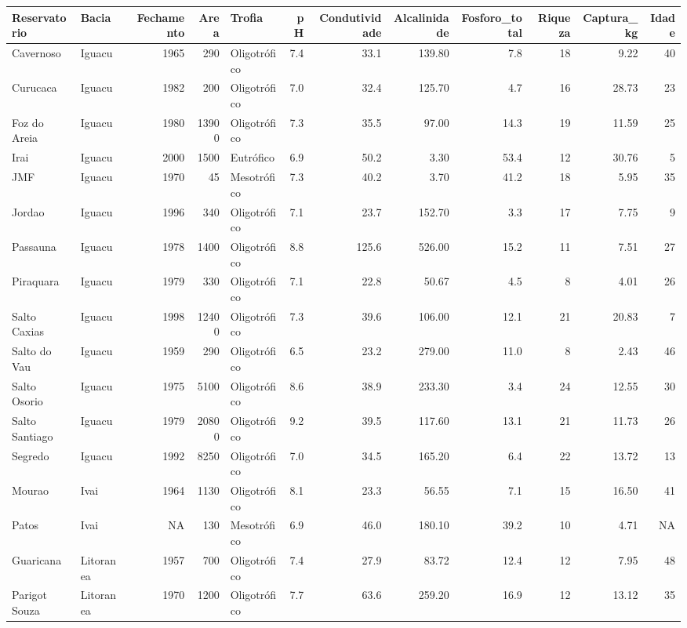 \documentclass[
]{book}
\begin{document}
\begin{table}
\centering\begingroup\fontsize{8}{10}\selectfont

\begin{tabular}{llrrlrrrrrrr}
\toprule
Reservatorio & Bacia & Fechamento & Area & Trofia & pH & Condutividade & Alcalinidade & Fosforo\_total & Riqueza & Captura\_kg & Idade\\
\midrule
Cavernoso & Iguacu & 1965 & 290 & Oligotrófico & 7.4 & 33.1 & 139.80 & 7.8 & 18 & 9.22 & 40\\
Curucaca & Iguacu & 1982 & 200 & Oligotrófico & 7.0 & 32.4 & 125.70 & 4.7 & 16 & 28.73 & 23\\
Foz do Areia & Iguacu & 1980 & 13900 & Oligotrófico & 7.3 & 35.5 & 97.00 & 14.3 & 19 & 11.59 & 25\\
Irai & Iguacu & 2000 & 1500 & Eutrófico & 6.9 & 50.2 & 3.30 & 53.4 & 12 & 30.76 & 5\\
JMF & Iguacu & 1970 & 45 & Mesotrófico & 7.3 & 40.2 & 3.70 & 41.2 & 18 & 5.95 & 35\\
\addlinespace
Jordao & Iguacu & 1996 & 340 & Oligotrófico & 7.1 & 23.7 & 152.70 & 3.3 & 17 & 7.75 & 9\\
Passauna & Iguacu & 1978 & 1400 & Oligotrófico & 8.8 & 125.6 & 526.00 & 15.2 & 11 & 7.51 & 27\\
Piraquara & Iguacu & 1979 & 330 & Oligotrófico & 7.1 & 22.8 & 50.67 & 4.5 & 8 & 4.01 & 26\\
Salto Caxias & Iguacu & 1998 & 12400 & Oligotrófico & 7.3 & 39.6 & 106.00 & 12.1 & 21 & 20.83 & 7\\
Salto do Vau & Iguacu & 1959 & 290 & Oligotrófico & 6.5 & 23.2 & 279.00 & 11.0 & 8 & 2.43 & 46\\
\addlinespace
Salto Osorio & Iguacu & 1975 & 5100 & Oligotrófico & 8.6 & 38.9 & 233.30 & 3.4 & 24 & 12.55 & 30\\
Salto Santiago & Iguacu & 1979 & 20800 & Oligotrófico & 9.2 & 39.5 & 117.60 & 13.1 & 21 & 11.73 & 26\\
Segredo & Iguacu & 1992 & 8250 & Oligotrófico & 7.0 & 34.5 & 165.20 & 6.4 & 22 & 13.72 & 13\\
Mourao & Ivai & 1964 & 1130 & Oligotrófico & 8.1 & 23.3 & 56.55 & 7.1 & 15 & 16.50 & 41\\
Patos & Ivai & NA & 130 & Mesotrófico & 6.9 & 46.0 & 180.10 & 39.2 & 10 & 4.71 & NA\\
\addlinespace
Guaricana & Litoranea & 1957 & 700 & Oligotrófico & 7.4 & 27.9 & 83.72 & 12.4 & 12 & 7.95 & 48\\
Parigot Souza & Litoranea & 1970 & 1200 & Oligotrófico & 7.7 & 63.6 & 259.20 & 16.9 & 12 & 13.12 & 35\\

\end{tabular}
\end{table}
\end{document}
